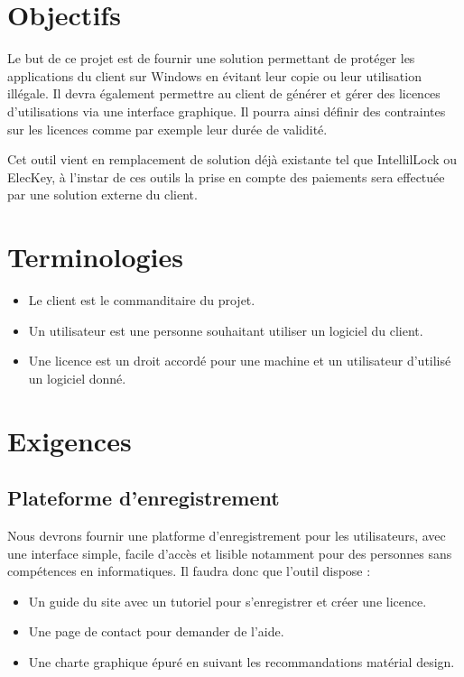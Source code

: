 \chapter{Objectifs}

Le but de ce projet est de fournir une solution permettant de protéger les applications
du client sur Windows en évitant leur copie ou leur utilisation illégale. 
Il devra également permettre au client de générer et gérer des licences d'utilisations 
via une interface graphique. Il pourra ainsi définir des contraintes sur les licences 
comme par exemple leur durée de validité. \newline

Cet outil vient en remplacement de solution déjà existante tel que IntellilLock ou ElecKey,
à l'instar de ces outils la prise en compte des paiements sera effectuée par une solution externe
du client.

\chapter{Terminologies}

\begin{itemize}
	\item Le client est le commanditaire du projet.
	\item Un utilisateur est une personne souhaitant utiliser un logiciel du client. 
	\item Une licence est un droit accordé pour une machine et un utilisateur d'utilisé un logiciel donné.
\end{itemize}

\chapter{Exigences}

\section{Plateforme d'enregistrement}
Nous devrons fournir une platforme d'enregistrement pour les utilisateurs, avec une interface simple, facile d'accès et lisible notamment pour des personnes sans compétences en informatiques. Il faudra donc que l'outil dispose :
\begin{itemize}
	\item Un guide du site avec un tutoriel pour s'enregistrer et créer une licence.
	\item Une page de contact pour demander de l'aide.
	\item Une charte graphique épuré en suivant les recommandations matérial design.
\end{itemize}

